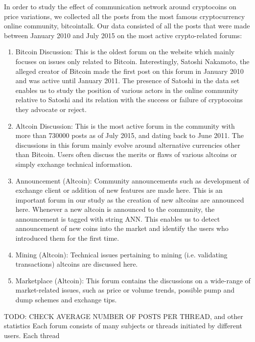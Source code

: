 In order to study the effect of communication network around cryptocoins on
price variations, we collected all the posts from the most famous cryptocurrency
online community, bitcointalk.  Our data consisted of all the posts that were
made between January 2010 and July 2015 on the most active crypto-related forums:
\begin{enumerate}
  \item{Bitcoin Discussion:} This is the oldest forum on the website which mainly focuses
    on issues only related to Bitcoin. Interestingly, Satoshi Nakamoto, the alleged
    creator of Bitcoin made the first post on this forum in January 2010 and
    was active until January 2011. The presence of Satoshi in the data set enables us
    to study the position of various actors in the online community relative to Satoshi
    and its relation with the success or failure of cryptocoins they advocate or reject.

  \item{Altcoin Discussion:} This is the most active forum in the community
    with more than 730000 posts as of July 2015, and dating back to June 2011.
    The discussions in this forum mainly evolve around alternative currencies
    other than Bitcoin. Users often discuss the merits or flaws of various
    altcoins or simply exchange technical information.
  
  \item{Announcement (Altcoin):} Community announcements such as development of 
    exchange client or addition of new features are made here. This is an important forum
    in our study as the creation of new altcoins are announced here. Whenever a new
    altcoin is announced to the community, the announcement is tagged with string ANN.
    This enables us to detect announcement of new coins into the market and identify
    the users who introduced them for the first time.

  \item{Mining (Altcoin):} Technical issues pertaining to mining (i.e. validating transactions)
    altcoins are discussed here.
  \item{Marketplace (Altcoin):} This forum contains the discussions on a wide-range of 
    market-related issues, such as price or volume trends, possible pump and dump schemes
    and exchange tips.

\end{enumerate}
TODO: CHECK AVERAGE NUMBER OF POSTS PER THREAD, and other statistics Each forum
consists of many subjects or threads initiated by different users. Each thread
